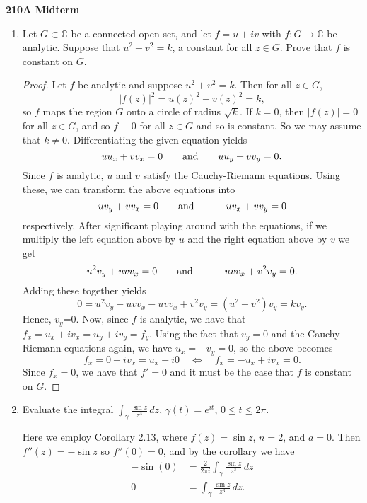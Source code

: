\documentclass[11pt,oneside,english]{amsart}
\theoremstyle{definition}
\newcommand{\aspace}{\hspace{7mm}\text{and}\hspace{7mm}}
\newcommand{\lspace}{\vspace{5mm}}
\newcommand{\MB}[1]{\mathbb{#1}}
\begin{document}
\rightline{\today}

\lspace



\textbf{210A Midterm}

\lspace

\begin{enumerate}[leftmargin=*]
\itemsep5mm


\item Let $G\subset \MB{C}$ be a connected open set, and let $f=u+iv$ with $f:G\to\MB{C}$ be analytic. Suppose that $u^2+v^2=k$, a constant for all $z\in G$. Prove that $f$ is constant on $G$.

\begin{proof}
Let $f$ be analytic and suppose $u^2+v^2=k$. Then for all $z\in G$,
\[
|f(z)|^2=u(z)^2+v(z)^2=k,
\]
so $f$ maps the region $G$ onto a circle of radius $\sqrt{k}$.  If $k=0$, then $|f(z)|=0$ for all $z\in G$, and so $f\equiv 0$ for all $z\in G$ and so is constant. So we may assume that $k\neq 0$. Differentiating the given equation yields
\[
uu_x+vv_x=0 \aspace uu_y+vv_y=0.
\]
Since $f$ is analytic, $u$ and $v$ satisfy the Cauchy-Riemann equations. Using these, we can transform the above equations into
\[
uv_y+vv_x=0 \aspace -uv_x+vv_y=0
\]
respectively. After significant playing around with the equations, if we multiply the left equation above by $u$ and the right equation above by $v$ we get
\[
u^2v_y+uvv_x=0 \aspace -uvv_x+v^2v_y=0.
\]
Adding these together yields
\[
0=u^2v_y+uvv_x-uvv_x+v^2v_y=(u^2+v^2)v_y=kv_y.
\]
Hence, $v_y$=0. Now, since $f$ is analytic, we have that $f_x=u_x+iv_x=u_y+iv_y=f_y$. Using the fact that $v_y=0$ and the Cauchy-Riemann equations again, we have $u_x=-v_y=0$, so the above becomes
\[
f_x=0+iv_x=u_x+i0\quad \iff \quad f_x=-u_x+iv_x=0.
\]
Since $f_x=0$, we have that $f'=0$ and it must be the case that $f$ is constant on $G$.
\end{proof}

\vfill
\pagebreak

\item Evaluate the integral $\displaystyle \int_\gamma \frac{\sin z}{z^3}\,dz$, $\gamma(t)=e^{it}$, $0\leq t\leq 2\pi$. 

Here we employ Corollary 2.13, where $f(z)=\sin z$, $n=2$, and $a=0$. Then $f''(z)=-\sin z$ so $f''(0)=0$, and by the corollary we have
\begin{align*}
-\sin(0)&=\frac{2}{2\pi i}\int_\gamma \frac{\sin z}{z^3}\,dz\\[2mm]
0&=\int_\gamma \frac{\sin z}{z^3}\,dz.
\end{align*}


\end{enumerate}
\end{document}
